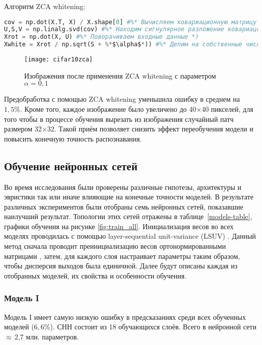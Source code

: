 Алгоритм ZCA whitening:
\begin{lstlisting}[language=Python, frame=TB]
cov = np.dot(X.T, X) / X.shape[0] #%* Вычисляем ковариационную матрицу *)
U,S,V = np.linalg.svd(cov) #%* Находим сигнулярное разложение ковариацонной матрицы *)
Xrot = np.dot(X, U) #%* Поворачиваем входные данные *)
Xwhite = Xrot / np.sqrt(S + %*$\alpha$*)) #%* Делим на собственные числа *)
\end{lstlisting}
\vspace*{-1.4cm}
\begin{figure}[h]
    \centering
    \texttt{[image: cifar10zca]}
    \caption{Изображения после применения ZCA whitening с параметром $\alpha=0,1$}
\end{figure}
Предобработка с помощью ZCA whitening уменьшила ошибку в среднем на $1,5\%$. Кроме того, каждое изображение было
увеличено до 40$\times$40 пикселей, для того чтобы в процессе обучения вырезать из 
изображения случайный патч размером 32$\times$32. Такой приём позволяет снизить эффект переобучения модели и повысить конечную 
точность распознавания.

\subsection{Обучение нейронных сетей}
Во время исследования были проверены различные гипотезы, архитектуры и эвристики так или иначе влияющие на конечные точности 
моделей. В результате различных экспериментов были отобраны семь нейронных сетей, показавшие наилучший результат.
Топологии этих сетей отражены в таблице~\ref{models-table}, графики обучения на рисунке \ref{fig:train_all}.
Инициализация весов во всех моделях проводилась с помощью layer-sequential unit-variance (LSUV) \cite{DBLP:journals/corr/MishkinM15}.
Данный метод сначала проводит преинициализацию весов ортонормированными матрицами \cite{DBLP:journals/corr/SaxeMG13},
затем, для каждого слоя настраивает параметры таким образом, чтобы дисперсия выходов была единичной.
Далее будут описаны каждая из отобранных моделей, их свойства и особенности обучения.

\subsubsection{Модель I}
Модель I имеет самую низкую ошибку в предсказаниях среди всех обученных моделей ($6,6$\%). СНН состоит из 18 обучающихся слоёв.
Всего в нейронной сети $\approx$\,2,7 млн. параметров.

